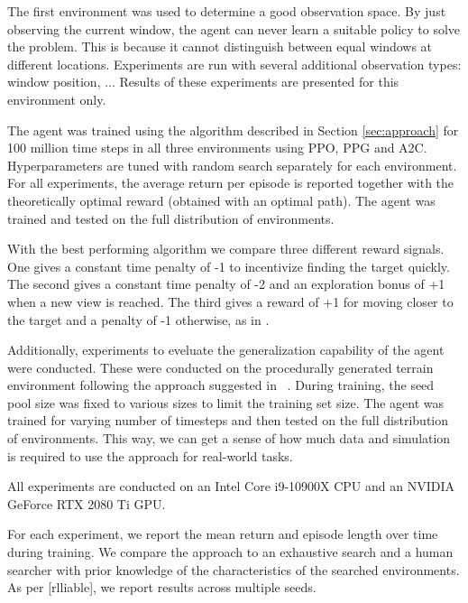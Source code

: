 The first environment was used to determine a good observation space.
By just observing the current window, the agent can never learn a suitable policy to solve the problem.
This is because it cannot distinguish between equal windows at different locations.
Experiments are run with several additional observation types: window position, ...
Results of these experiments are presented for this environment only.

The agent was trained using the algorithm described in Section \ref{sec:approach} for 100 million time steps in all three environments using PPO, PPG and A2C.
Hyperparameters are tuned with random search separately for each environment.
For all experiments, the average return per episode is reported together with the theoretically optimal reward (obtained with an optimal path).
The agent was trained and tested on the full distribution of environments.

With the best performing algorithm we compare three different reward signals.
One gives a constant time penalty of -1 to incentivize finding the target quickly.
The second gives a constant time penalty of -2 and an exploration bonus of +1 when a new view is reached.
The third gives a reward of +1 for moving closer to the target and a penalty of -1 otherwise, as in \cite{caicedo_active_2015}.

Additionally, experiments to eveluate the generalization capability of the agent were conducted.
These were conducted on the procedurally generated terrain environment following the approach suggested in ~\cite{procgen}.
During training, the seed pool size was fixed to various sizes to limit the training set size.
The agent was trained for varying number of timesteps and then tested on the full distribution of environments.
This way, we can get a sense of how much data and simulation is required to use the approach for real-world tasks.

All experiments are conducted on an Intel Core i9-10900X CPU and an NVIDIA GeForce RTX 2080 Ti GPU.

For each experiment, we report the mean return and episode length over time during training.
We compare the approach to an exhaustive search and a human searcher with prior knowledge of the characteristics of the searched environments.
As per [rlliable], we report results across multiple seeds.



